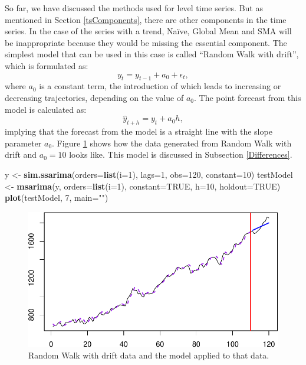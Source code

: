 \documentclass[]{book}
\newenvironment{Shaded}{\begin{snugshade}}{\end{snugshade}}
\newcommand{\DataTypeTok}[1]{\textcolor[rgb]{0.13,0.29,0.53}{#1}}
\newcommand{\DecValTok}[1]{\textcolor[rgb]{0.00,0.00,0.81}{#1}}
\newcommand{\KeywordTok}[1]{\textcolor[rgb]{0.13,0.29,0.53}{\textbf{#1}}}
\newcommand{\NormalTok}[1]{#1}
\newcommand{\OtherTok}[1]{\textcolor[rgb]{0.56,0.35,0.01}{#1}}
\newcommand{\StringTok}[1]{\textcolor[rgb]{0.31,0.60,0.02}{#1}}
\theoremstyle{definition}
\theoremstyle{definition}
\theoremstyle{definition}
\theoremstyle{definition}
\theoremstyle{remark}
\begin{document}
So far, we have discussed the methods used for level time series. But as mentioned in Section \ref{tsComponents}, there are other components in the time series. In the case of the series with a trend, Naïve, Global Mean and SMA will be inappropriate because they would be missing the essential component. The simplest model that can be used in this case is called ``Random Walk with drift'', which is formulated as:
\begin{equation}
    y_t = y_{t-1} + a_0 + \epsilon_t,
    \label{eq:RandomWalkWithDrift}
\end{equation}
where \(a_0\) is a constant term, the introduction of which leads to increasing or decreasing trajectories, depending on the value of \(a_0\). The point forecast from this model is calculated as:
\begin{equation}
    \hat{y}_{t+h} = y_{t} + a_0 h,
    \label{eq:RandomWalkWithDriftForecast}
\end{equation}
implying that the forecast from the model is a straight line with the slope parameter \(a_0\). Figure \ref{fig:RWDriftExample} shows how the data generated from Random Walk with drift and \(a_0=10\) looks like. This model is discussed in Subsection \ref{Differences}.

\begin{Shaded}
\begin{Highlighting}[]
\NormalTok{y <-}\StringTok{ }\KeywordTok{sim.ssarima}\NormalTok{(}\DataTypeTok{orders=}\KeywordTok{list}\NormalTok{(}\DataTypeTok{i=}\DecValTok{1}\NormalTok{), }\DataTypeTok{lags=}\DecValTok{1}\NormalTok{, }\DataTypeTok{obs=}\DecValTok{120}\NormalTok{,}
                 \DataTypeTok{constant=}\DecValTok{10}\NormalTok{)}
\NormalTok{testModel <-}\StringTok{ }\KeywordTok{msarima}\NormalTok{(y, }\DataTypeTok{orders=}\KeywordTok{list}\NormalTok{(}\DataTypeTok{i=}\DecValTok{1}\NormalTok{), }\DataTypeTok{constant=}\OtherTok{TRUE}\NormalTok{,}
                     \DataTypeTok{h=}\DecValTok{10}\NormalTok{, }\DataTypeTok{holdout=}\OtherTok{TRUE}\NormalTok{)}
\KeywordTok{plot}\NormalTok{(testModel, }\DecValTok{7}\NormalTok{, }\DataTypeTok{main=}\StringTok{""}\NormalTok{)}
\end{Highlighting}
\end{Shaded}

\begin{figure}
\centering
\includegraphics{Svetunkov--2022----ADAM_files/figure-latex/RWDriftExample-1.pdf}
\caption{\label{fig:RWDriftExample}Random Walk with drift data and the model applied to that data.}
\end{figure}
\end{document}
